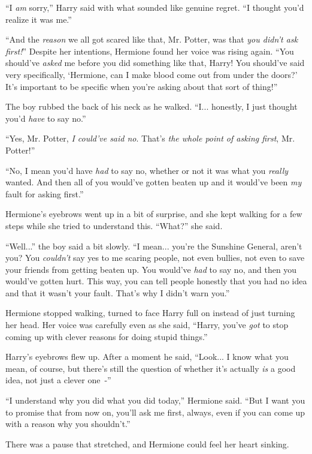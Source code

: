 ``I \emph{am} sorry,'' Harry said with what sounded like genuine regret. ``I thought you'd realize it was me.''

``And the \emph{reason} we all got scared like that, Mr. Potter, was that \emph{you didn't ask first!}'' Despite her intentions, Hermione found her voice was rising again. ``You should've \emph{asked} me before you did something like that, Harry! You should've said very specifically, `Hermione, can I make blood come out from under the doors?' It's important to be specific when you're asking about that sort of thing!''

The boy rubbed the back of his neck as he walked. ``I... honestly, I just thought you'd \emph{have} to say no.''

``Yes, Mr. Potter, \emph{I could've said no}. That's \emph{the whole point of asking first}, Mr. Potter!''

``No, I mean you'd have \emph{had} to say no, whether or not it was what you \emph{really} wanted. And then all of you would've gotten beaten up and it would've been \emph{my} fault for asking first.''

Hermione's eyebrows went up in a bit of surprise, and she kept walking for a few steps while she tried to understand this. ``What?'' she said.

``Well...'' the boy said a bit slowly. ``I mean... you're the Sunshine General, aren't you? You \emph{couldn't} say yes to me scaring people, not even bullies, not even to save your friends from getting beaten up. You would've \emph{had} to say no, and then you would've gotten hurt. This way, you can tell people honestly that you had no idea and that it wasn't your fault. That's why I didn't warn you.''

Hermione stopped walking, turned to face Harry full on instead of just turning her head. Her voice was carefully even as she said, ``Harry, you've \emph{got} to stop coming up with clever reasons for doing stupid things.''

Harry's eyebrows flew up. After a moment he said, ``Look... I know what you mean, of course, but there's still the question of whether it's actually \emph{is} a good idea, not just a clever one~-''

``I understand why you did what you did today,'' Hermione said. ``But I want you to promise that from now on, you'll ask me first, always, even if you can come up with a reason why you shouldn't.''

There was a pause that stretched, and Hermione could feel her heart sinking.

